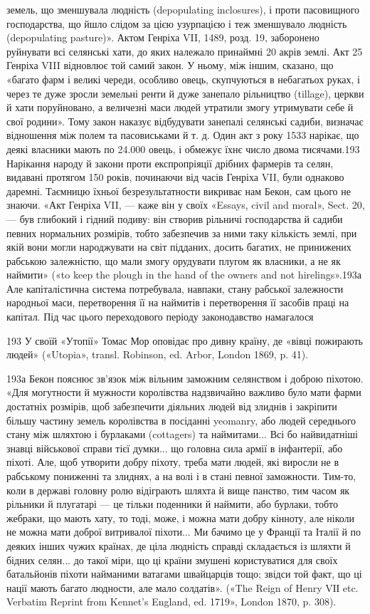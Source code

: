 земель, що зменшувала людність (depopulating inclosures), і
проти пасовищного господарства, що йшло слідом за цією узурпацією
і теж зменшувало людність (depopulating pasture)».
Актом Генріха VII, 1489, розд. 19, заборонено руйнувати всі
селянські хати, до яких належало принаймні 20 акрів землі.
Акт 25 Генріха VIII відновлює той самий закон. У ньому, між
іншим, сказано, що «багато фарм і великі череди, особливо
овець, скупчуються в небагатьох руках, і через те дуже зросли
земельні ренти й дуже занепало рільництво (tillage), церкви й
хати поруйновано, а величезні маси людей утратили змогу утримувати
себе й свої родини». Тому закон наказує відбудувати
занепалі селянські садиби, визначає відношення між полем та
пасовиськами й т. д. Один акт з року 1533 нарікає, що деякі
власники мають по 24.000 овець, і обмежує їхнє число двома тисячами.193
Нарікання народу й закони проти експропріяції дрібних
фармерів та селян, видавані протягом 150 років, починаючи від
часів Генріха VII, були однаково даремні. Таємницю їхньої
безрезультатности викриває нам Бекон, сам цього не знаючи.
«Акт Генріха VII, — каже він у своїх «Essays, civil and moral»,
Sect. 20, — був глибокий і гідний подиву: він створив рільничі
господарства й садиби певних нормальних розмірів, тобто забезпечив
за ними таку кількість землі, при якій вони могли народжувати
на світ підданих, досить багатих, не принижених рабською залежністю,
що мали змогу орудувати плугом як власники, а не
як наймити» («to keep the plough in the hand of the owners and
not hirelings».193а Але капіталістична система потребувала,
навпаки, стану рабської залежности народньої маси, перетворення
її на наймитів і перетворення її засобів праці на капітал.
Під час цього переходового періоду законодавство намагалося

193    У своїй «Утопії» Томас Мор оповідає про дивну країну, де
«вівці пожирають людей» («Utopia», transl. Robinson, ed. Arbor, London
1869, p. 41).

193а Бекон пояснює зв’язок між вільним заможним селянством і
доброю піхотою. «Для могутности й мужности королівства надзвичайно
важливо було мати фарми достатніх розмірів, щоб забезпечити діяльних
людей від злиднів і закріпити більшу частину земель королівства в посіданні
yeomanry, або людей середнього стану між шляхтою і бурлаками
(cottagers) та наймитами... Всі бо найвидатніші знавці військової справи
тієї думки... що головна сила армії в інфантерії, або піхоті. Але, щоб
утворити добру піхоту, треба мати людей, які виросли не в рабському
пониженні та злиднях, а на волі і в стані певної заможности. Тим-то,
коли в державі головну ролю відіграють шляхта й вище панство, тим часом
як рільники й плугатарі — це тільки поденники й наймити, або
бурлаки, тобто жебраки, що мають хату, то тоді, може, і можна мати
добру кінноту, але ніколи не можна мати доброї витривалої піхоти...
Ми бачимо це у Франції та Італії й по деяких інших чужих країнах, де
ціла людність справді складається із шляхти й бідних селян... до такої
міри, що ці країни змушені користуватися для своїх батальйонів піхоти
найманими ватагами швайцарців тощо; звідси той факт, що ці нації
мають багато людности, але мало солдатів». («The Reign of Henry VІІ
etc. Verbatim Reprint from Kennet’s England, ed. 1719», London 1870,
p. 308).
